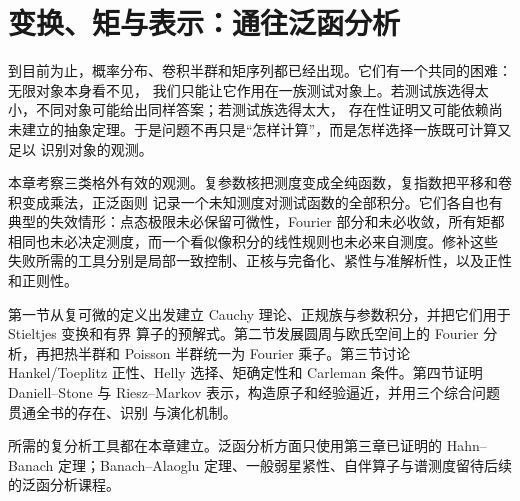 \chapter{变换、矩与表示：通往泛函分析}\label{ch:07}

到目前为止，概率分布、卷积半群和矩序列都已经出现。它们有一个共同的困难：无限对象本身看不见，
我们只能让它作用在一族测试对象上。若测试族选得太小，不同对象可能给出同样答案；若测试族选得太大，
存在性证明又可能依赖尚未建立的抽象定理。于是问题不再只是“怎样计算”，而是怎样选择一族既可计算又足以
识别对象的观测。

本章考察三类格外有效的观测。复参数核把测度变成全纯函数，复指数把平移和卷积变成乘法，正泛函则
记录一个未知测度对测试函数的全部积分。它们各自也有典型的失效情形：点态极限未必保留可微性，Fourier
部分和未必收敛，所有矩都相同也未必决定测度，而一个看似像积分的线性规则也未必来自测度。修补这些
失败所需的工具分别是局部一致控制、正核与完备化、紧性与准解析性，以及正性和正则性。

第一节从复可微的定义出发建立 Cauchy 理论、正规族与参数积分，并把它们用于 Stieltjes 变换和有界
算子的预解式。第二节发展圆周与欧氏空间上的 Fourier 分析，再把热半群和 Poisson 半群统一为
Fourier 乘子。第三节讨论 Hankel/Toeplitz 正性、Helly 选择、矩确定性和 Carleman 条件。第四节证明
Daniell--Stone 与 Riesz--Markov 表示，构造原子和经验逼近，并用三个综合问题贯通全书的存在、识别
与演化机制。

所需的复分析工具都在本章建立。泛函分析方面只使用第三章已证明的 Hahn--Banach
定理；Banach--Alaoglu 定理、一般弱星紧性、自伴算子与谱测度留待后续的泛函分析课程。





